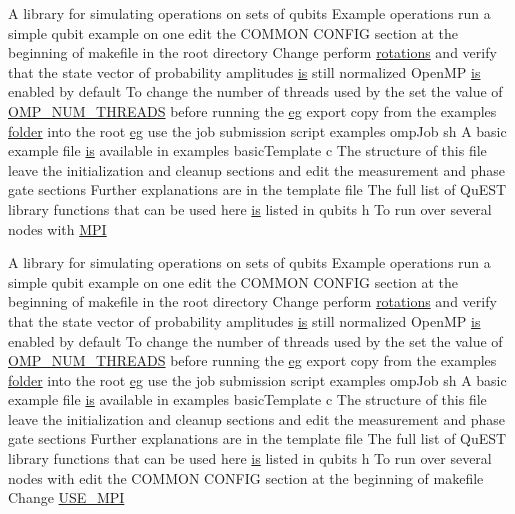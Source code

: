 \begin{DoxyCompactItemize}
A library for simulating operations on sets of qubits Example operations run a simple qubit example on one edit the COMMON CONFIG section at the beginning of makefile in the root directory Change perform \hyperlink{README_8md_aa51a655a099aacfa420285f13958dee7}{rotations} and verify that the state vector of probability amplitudes \hyperlink{README_8md_a2a622829425af2df994a6f7c6deb0c91}{is} still normalized OpenMP \hyperlink{README_8md_a2a622829425af2df994a6f7c6deb0c91}{is} enabled by default To change the number of threads used by the set the value of \hyperlink{README_8md_a79266f70cc0ecc5861ae53ebd180bf65}{OMP\_\-NUM\_\-THREADS} before running the \hyperlink{README_8md_accf5ef1dd79776855485925f622a4f09}{eg} export copy from the examples \hyperlink{README_8md_ac7a6c2e0f131857c641dc6c0bc4a395a}{folder} into the root \hyperlink{README_8md_accf5ef1dd79776855485925f622a4f09}{eg} use the job submission script examples ompJob sh A basic example file \hyperlink{README_8md_a2a622829425af2df994a6f7c6deb0c91}{is} available in examples basicTemplate c The structure of this file leave the initialization and cleanup sections and edit the measurement and phase gate sections Further explanations are in the template file The full list of QuEST library functions that can be used here \hyperlink{README_8md_a2a622829425af2df994a6f7c6deb0c91}{is} listed in qubits h To run over several nodes with \hyperlink{README_8md_a2ef63d6f3e80a1213c1768b39ff03fca}{MPI}
\item 
A library for simulating operations on sets of qubits Example operations run a simple qubit example on one edit the COMMON CONFIG section at the beginning of makefile in the root directory Change perform \hyperlink{README_8md_aa51a655a099aacfa420285f13958dee7}{rotations} and verify that the state vector of probability amplitudes \hyperlink{README_8md_a2a622829425af2df994a6f7c6deb0c91}{is} still normalized OpenMP \hyperlink{README_8md_a2a622829425af2df994a6f7c6deb0c91}{is} enabled by default To change the number of threads used by the set the value of \hyperlink{README_8md_a79266f70cc0ecc5861ae53ebd180bf65}{OMP\_\-NUM\_\-THREADS} before running the \hyperlink{README_8md_accf5ef1dd79776855485925f622a4f09}{eg} export copy from the examples \hyperlink{README_8md_ac7a6c2e0f131857c641dc6c0bc4a395a}{folder} into the root \hyperlink{README_8md_accf5ef1dd79776855485925f622a4f09}{eg} use the job submission script examples ompJob sh A basic example file \hyperlink{README_8md_a2a622829425af2df994a6f7c6deb0c91}{is} available in examples basicTemplate c The structure of this file leave the initialization and cleanup sections and edit the measurement and phase gate sections Further explanations are in the template file The full list of QuEST library functions that can be used here \hyperlink{README_8md_a2a622829425af2df994a6f7c6deb0c91}{is} listed in qubits h To run over several nodes with edit the COMMON CONFIG section at the beginning of makefile Change \hyperlink{README_8md_a4067a4159633c2e4cd24809986ad3bc2}{USE\_\-MPI}
\end{DoxyCompactItemize}


